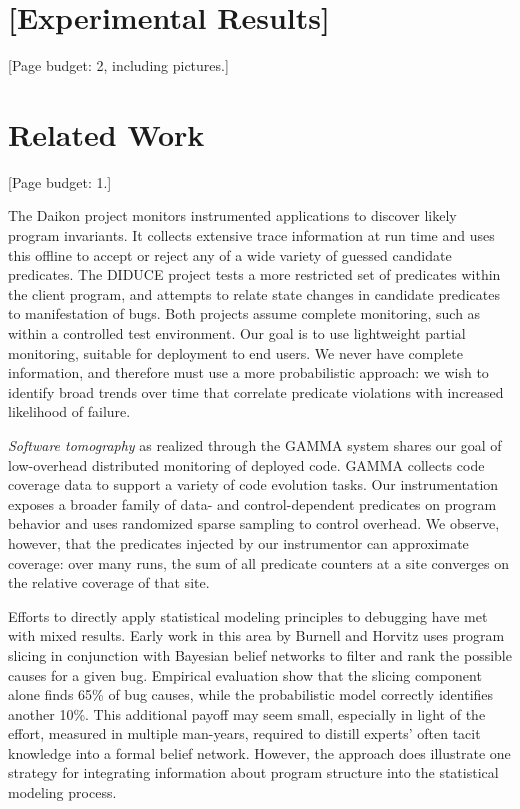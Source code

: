 \documentclass{sig-alternate}
\newcommand{\termdef}[1]{\textit{#1}}
\newcommand{\placeholder}[1]{{\color[cmyk]{0,0.61,0.87,0}[#1]}}
\begin{document}


\section{\placeholder{Experimental Results}}
\label{sec:experiments:results}
\placeholder{Page budget: 2, including pictures.}


\section{Related Work}
\label{sec:related-work}

\placeholder{Page budget: 1.}

The Daikon project \cite{ernst2001} monitors instrumented applications
to discover likely program invariants.  It collects extensive trace
information at run time and uses this offline to accept or reject any
of a wide variety of guessed candidate predicates.  The DIDUCE project
\cite{ICSE02*291} tests a more restricted set of predicates within the
client program, and attempts to relate state changes in candidate
predicates to manifestation of bugs.  Both projects assume complete
monitoring, such as within a controlled test environment.  Our goal is
to use lightweight partial monitoring, suitable for deployment to end
users.  We never have complete information, and therefore must use a
more probabilistic approach: we wish to identify broad trends over
time that correlate predicate violations with increased likelihood of
failure.

\termdef{Software tomography} as realized through the GAMMA system
\cite{PASTE'02*2,Orso:2003:LFDIART} shares our goal of low-overhead
distributed monitoring of deployed code.  GAMMA collects code coverage
data to support a variety of code evolution tasks.  Our
instrumentation exposes a broader family of data- and
control-dependent predicates on program behavior and uses randomized
sparse sampling to control overhead.  We observe, however, that the
predicates injected by our instrumentor can approximate coverage: over
many runs, the sum of all predicate counters at a site converges on
the relative coverage of that site.

Efforts to directly apply statistical modeling principles to debugging
have met with mixed results.  Early work in this area by Burnell and
Horvitz \cite{Burnell:1995:SCM} uses program slicing in conjunction
with Bayesian belief networks to filter and rank the possible causes
for a given bug.  Empirical evaluation show that the slicing component
alone finds 65\% of bug causes, while the probabilistic model
correctly identifies another 10\%.  This additional payoff may seem
small, especially in light of the effort, measured in multiple
man-years, required to distill experts' often tacit knowledge into a
formal belief network.  However, the approach does illustrate one
strategy for integrating information about program structure into the
statistical modeling process.
\end{document}
